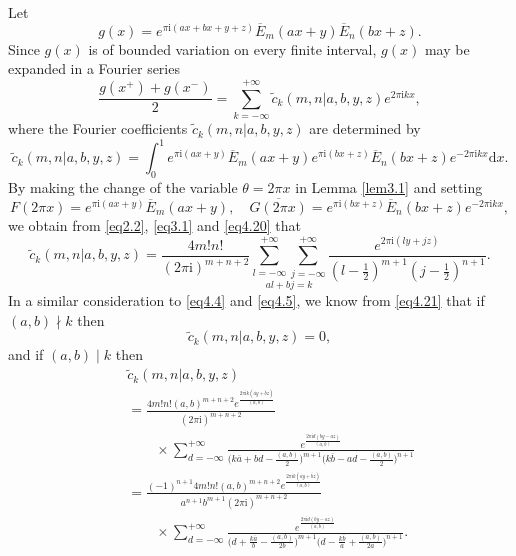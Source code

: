 \documentclass[reqno]{amsart}
\numberwithin{equation}{section}
\begin{document}
Let
\begin{equation*}
g(x)=e^{\pi\mathrm{i}(ax+bx+y+z)}\overline{E}_{m}(ax+y)\overline{E}_{n}(bx+z).
\end{equation*}
Since $g(x)$ is of bounded variation on every finite interval, $g(x)$ may be expanded in a Fourier series
\begin{equation}\label{eq4.19}
\frac{g(x^{+})+g(x^{-})}{2}=\sum_{k=-\infty}^{+\infty}\widetilde{c}_{k}(m,n|a,b,y,z)e^{2\pi\mathrm{i}kx},
\end{equation}
where the Fourier coefficients $\widetilde{c}_{k}(m,n|a,b,y,z)$ are determined by
\begin{equation}\label{eq4.20}
\widetilde{c}_{k}(m,n|a,b,y,z)=\int_{0}^{1}e^{\pi\mathrm{i}(ax+y)}\overline{E}_{m}(ax+y)e^{\pi\mathrm{i}(bx+z)}\overline{E}_{n}(bx+z)e^{-2\pi\mathrm{i}kx}\text{d}x.
\end{equation}
By making the change of the variable $\theta=2\pi x$ in Lemma \ref{lem3.1} and setting
\begin{equation*}
F(2\pi x)=e^{\pi\mathrm{i}(ax+y)}\overline{E}_{m}(ax+y),\quad\overline{G(2\pi x)}=e^{\pi\mathrm{i}(bx+z)}\overline{E}_{n}(bx+z)e^{-2\pi\mathrm{i}kx},
\end{equation*}
we obtain from \eqref{eq2.2}, \eqref{eq3.1} and \eqref{eq4.20} that
\begin{equation}\label{eq4.21}
\widetilde{c}_{k}(m,n|a,b,y,z)=\frac{4m!n!}{(2\pi \mathrm{i})^{m+n+2}}\underset{al+bj=k}{\sum_{l=-\infty}^{+\infty}\sum_{j=-\infty}^{+\infty}}\frac{e^{2\pi\mathrm{i}(ly+jz)}} {(l-\frac{1}{2})^{m+1}(j-\frac{1}{2})^{n+1}}.
\end{equation}
In a similar consideration to \eqref{eq4.4} and \eqref{eq4.5}, we know from \eqref{eq4.21} that if $(a,b)\nmid k$ then
\begin{equation}\label{eq4.22}
\widetilde{c}_{k}(m,n|a,b,y,z)=0,
\end{equation}
and if $(a,b)\mid k$ then
\begin{eqnarray}\label{eq4.23}
&&\widetilde{c}_{k}(m,n|a,b,y,z)\nonumber\\
&&=\frac{4m!n!(a,b)^{m+n+2}e^{\frac{2\pi\mathrm{i}k(\overline{a}y+\overline{b}z)}{(a,b)}}}{(2\pi \mathrm{i})^{m+n+2}}\nonumber\\
&&\qquad\times\sum_{d=-\infty}^{+\infty}
\frac{e^{\frac{2\pi\mathrm{i}d(by-az)}{(a,b)}}}{\bigl(k\overline{a}+bd-\frac{(a,b)}{2}\bigl)^{m+1}
\bigl(k\overline{b}-ad-\frac{(a,b)}{2}\bigl)^{n+1}}\nonumber\\
&&=\frac{(-1)^{n+1}4m!n!(a,b)^{m+n+2}e^{\frac{2\pi\mathrm{i}k(\overline{a}y+\overline{b}z)}{(a,b)}}}{a^{n+1}b^{m+1}(2\pi \mathrm{i})^{m+n+2}}\nonumber\\
&&\qquad\times\sum_{d=-\infty}^{+\infty}
\frac{e^{\frac{2\pi\mathrm{i}d(by-az)}{(a,b)}}}{\bigl(d+\frac{k\overline{a}}{b}-\frac{(a,b)}{2b}\bigl)^{m+1}
\bigl(d-\frac{k\overline{b}}{a}+\frac{(a,b)}{2a}\bigl)^{n+1}}.
\end{eqnarray}
\end{document}
